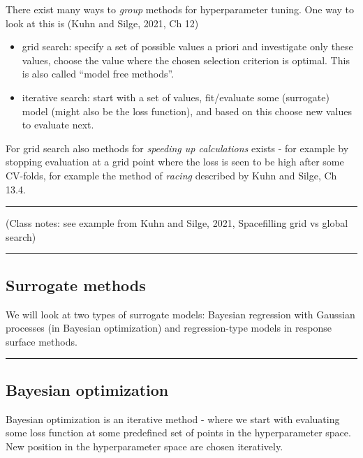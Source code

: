 \documentclass[
  letterpaper,
  DIV=11,
  numbers=noendperiod]{scrartcl}
\providecommand{\tightlist}{%
  \setlength{\itemsep}{0pt}\setlength{\parskip}{0pt}}\usepackage{longtable,booktabs,array}
\begin{document}
There exist many ways to \emph{group} methods for hyperparameter tuning.
One way to look at this is (Kuhn and Silge, 2021, Ch 12)

\begin{itemize}
\tightlist
\item
  grid search: specify a set of possible values a priori and investigate
  only these values, choose the value where the chosen selection
  criterion is optimal. This is also called ``model free methods''.
\item
  iterative search: start with a set of values, fit/evaluate some
  (surrogate) model (might also be the loss function), and based on this
  choose new values to evaluate next.
\end{itemize}

For grid search also methods for \emph{speeding up calculations} exists
- for example by stopping evaluation at a grid point where the loss is
seen to be high after some CV-folds, for example the method of
\emph{racing} described by Kuhn and Silge, Ch 13.4.

\begin{center}\rule{0.5\linewidth}{0.5pt}\end{center}

(Class notes: see example from Kuhn and Silge, 2021, Spacefilling grid
vs global search)

\begin{center}\rule{0.5\linewidth}{0.5pt}\end{center}

\hypertarget{surrogate-methods}{%
\subsection{Surrogate methods}\label{surrogate-methods}}

We will look at two types of surrogate models: Bayesian regression with
Gaussian processes (in Bayesian optimization) and regression-type models
in response surface methods.

\begin{center}\rule{0.5\linewidth}{0.5pt}\end{center}

\hypertarget{bayesian-optimization}{%
\subsection{Bayesian optimization}\label{bayesian-optimization}}

Bayesian optimization is an iterative method - where we start with
evaluating some loss function at some predefined set of points in the
hyperparameter space. New position in the hyperparameter space are
chosen iteratively.
\end{document}
